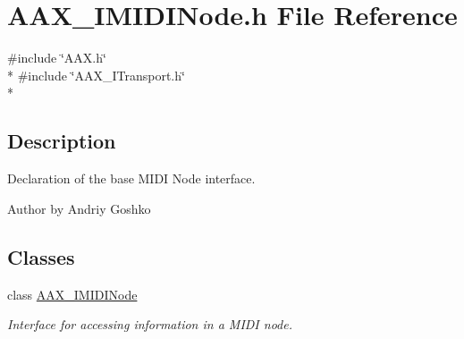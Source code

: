 \hypertarget{a00252}{}\section{A\+A\+X\+\_\+\+I\+M\+I\+D\+I\+Node.\+h File Reference}
\label{a00252}
{\ttfamily \#include \char`\"{}A\+A\+X.\+h\char`\"{}}\\*
{\ttfamily \#include \char`\"{}A\+A\+X\+\_\+\+I\+Transport.\+h\char`\"{}}\\*


\subsection{Description}
Declaration of the base M\+I\+D\+I Node interface. 

\begin{DoxyAuthor}{Author}
by Andriy Goshko 
\end{DoxyAuthor}
\subsection*{Classes}
\begin{DoxyCompactItemize}
\item 
class \hyperlink{a00105}{A\+A\+X\+\_\+\+I\+M\+I\+D\+I\+Node}
\begin{DoxyCompactList}\small\item\em Interface for accessing information in a M\+I\+D\+I node. \end{DoxyCompactList}\end{DoxyCompactItemize}
